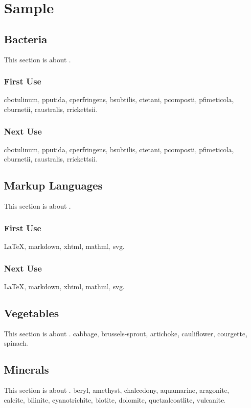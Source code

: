 \documentclass{scrreprt}
\begin{document}
\chapter{Sample}
\section{Bacteria}
This section is about .
\subsection{First Use}
\gls{cbotulinum}, \gls{pputida}, \gls{cperfringens},
\gls{bsubtilis}, \gls{ctetani}, \gls{pcomposti},
\gls{pfimeticola}, \gls{cburnetii}, \gls{raustralis},
\gls{rrickettsii}.

\subsection{Next Use}
\gls{cbotulinum}, \gls{pputida}, \gls{cperfringens},
\gls{bsubtilis}, \gls{ctetani}, \gls{pcomposti},
\gls{pfimeticola}, \gls{cburnetii}, \gls{raustralis},
\gls{rrickettsii}.

\section{Markup Languages}
This section is about .
\subsection{First Use}
\gls{LaTeX}, \gls{markdown}, \gls{xhtml}, \gls{mathml}, \gls{svg}.

\subsection{Next Use}
\gls{LaTeX}, \gls{markdown}, \gls{xhtml}, \gls{mathml}, \gls{svg}.

\section{Vegetables}
This section is about .
\gls{cabbage}, \gls{brussels-sprout}, \gls{artichoke}, 
\gls{cauliflower}, \gls{courgette}, \gls{spinach}.

\section{Minerals}
This section is about .
\Gls{beryl}, \gls{amethyst}, \gls{chalcedony}, \gls{aquamarine},
\gls{aragonite}, \gls{calcite}, \gls{bilinite}, 
\gls{cyanotrichite}, \gls{biotite}, \gls{dolomite}, 
\gls{quetzalcoatlite}, \gls{vulcanite}.
\end{document}
